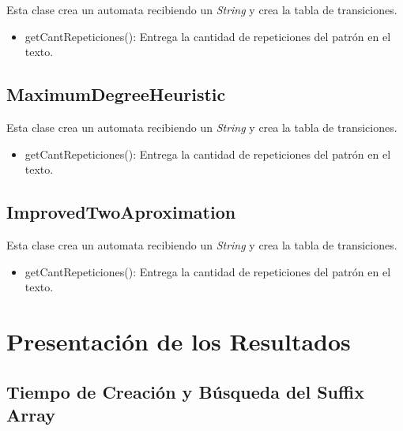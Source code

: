 \documentclass[letterpaper,10pt]{article}
\begin{document}
	Esta clase crea un automata recibiendo un \textit{String} y crea la tabla de transiciones.
	
	\begin{itemize}
	 \item getCantRepeticiones(): Entrega la cantidad de repeticiones del patrón en el texto.
	\end{itemize}
	
	\subsection{MaximumDegreeHeuristic}

	Esta clase crea un automata recibiendo un \textit{String} y crea la tabla de transiciones.
	
	\begin{itemize}
	 \item getCantRepeticiones(): Entrega la cantidad de repeticiones del patrón en el texto.
	\end{itemize}
	
	\subsection{ImprovedTwoAproximation}

	Esta clase crea un automata recibiendo un \textit{String} y crea la tabla de transiciones.
	
	\begin{itemize}
	 \item getCantRepeticiones(): Entrega la cantidad de repeticiones del patrón en el texto.
	\end{itemize}



	\newpage

	\section{Presentación de los Resultados}

	\subsection{Tiempo de Creación y Búsqueda del Suffix Array}
\end{document}
